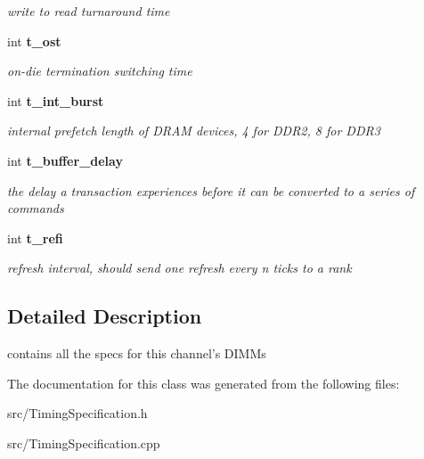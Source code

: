 \begin{CompactItemize}
\begin{CompactList}\small\item\em write to read turnaround time \item\end{CompactList}\item 
int {\bf t\_\-ost}\label{class_d_r_a_msim_i_i_1_1_timing_specification_e54f6727a9f82dc02dd193ecddf5c8cd}

\begin{CompactList}\small\item\em on-die termination switching time \item\end{CompactList}\item 
int {\bf t\_\-int\_\-burst}\label{class_d_r_a_msim_i_i_1_1_timing_specification_6d72dcc4ce25b88cb647e7f9b63fad35}

\begin{CompactList}\small\item\em internal prefetch length of DRAM devices, 4 for DDR2, 8 for DDR3 \item\end{CompactList}\item 
int {\bf t\_\-buffer\_\-delay}\label{class_d_r_a_msim_i_i_1_1_timing_specification_31d7e2bb92cbfbac8e4d726b47b94a40}

\begin{CompactList}\small\item\em the delay a transaction experiences before it can be converted to a series of commands \item\end{CompactList}\item 
int {\bf t\_\-refi}\label{class_d_r_a_msim_i_i_1_1_timing_specification_7c3fcb83affbf18fa739921d277178de}

\begin{CompactList}\small\item\em refresh interval, should send one refresh every n ticks to a rank \item\end{CompactList}\end{CompactItemize}


\subsection{Detailed Description}
contains all the specs for this channel's DIMMs 

The documentation for this class was generated from the following files:\begin{CompactItemize}
\item 
src/TimingSpecification.h\item 
src/TimingSpecification.cpp\end{CompactItemize}
